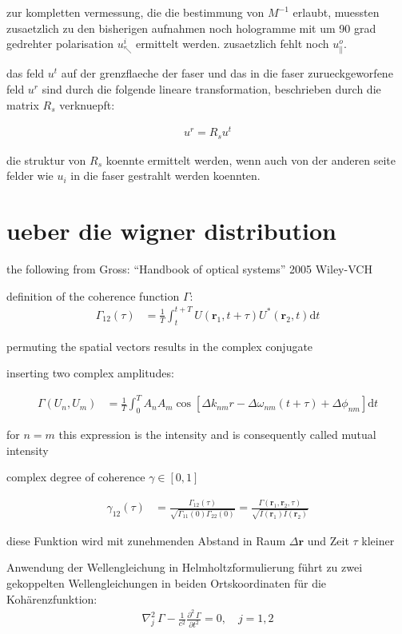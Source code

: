 \documentclass{article}
\newcommand{\vect}[1]{\mathbf{#1}}
\renewcommand{\r}{\vect r}
\begin{document}
zur kompletten vermessung, die die bestimmung von $M^{-1}$ erlaubt,
muessten zusaetzlich zu den bisherigen aufnahmen noch hologramme mit
um 90 grad gedrehter polarisation $u^i_\nwarrow$ ermittelt
werden. zusaetzlich fehlt noch $u^o_\parallel$.

das feld $u^t$ auf der grenzflaeche der faser und das in die faser
zurueckgeworfene feld $u^r$ sind durch die folgende lineare
transformation, beschrieben durch die matrix $R_s$ verknuepft:

\begin{align}
  u^r = R_s u^t
\end{align}

die struktur von $R_s$ koennte ermittelt werden, wenn auch von der
anderen seite felder wie $u_i$ in die faser gestrahlt werden koennten.

\section{ueber die wigner distribution}
the following from Gross: ``Handbook of optical systems'' 2005 Wiley-VCH

definition of the coherence function $\Gamma$:
\begin{align}
  \Gamma_{12}(\tau) &= \frac{1}{T}\int_t^{t+T} U(\r_1,t+\tau) U^*(\r_2,t)\textrm{d}t
\end{align}

permuting the spatial vectors results in the complex conjugate

inserting two complex amplitudes:

\begin{align}
  \Gamma(U_n, U_m) &= \frac{1}{T}\int_0^T A_n A_m \cos\left[ \Delta k_{nm} r -\Delta\omega_{nm}(t+\tau) + \Delta\phi_{nm} \right]\textrm{d}t
\end{align}

for $n=m$ this expression is the intensity and is consequently called mutual intensity

complex degree of coherence $\gamma\in[0,1]$

\begin{align}
  \gamma_{12}(\tau) &= \frac{\Gamma_{12}(\tau)}{\sqrt{\Gamma_{11}(0)\Gamma_{22}(0)}} = \frac{\Gamma(\r_1,\r_2,\tau)}{\sqrt{I(\r_1)I(\r_2)}}
\end{align}

diese Funktion wird mit zunehmenden Abstand in Raum $\Delta\r$ und Zeit $\tau$ kleiner

Anwendung der Wellengleichung in Helmholtzformulierung f\"uhrt zu zwei
gekoppelten Wellengleichungen in beiden Ortskoordinaten f\"ur die
Koh\"arenzfunktion:
\begin{align}
  \nabla_j^2\,\Gamma - \frac{1}{c^2} \frac{\partial^2\, \Gamma}{\partial t^2} = 0, \quad j=1,2
\end{align}
\end{document}

